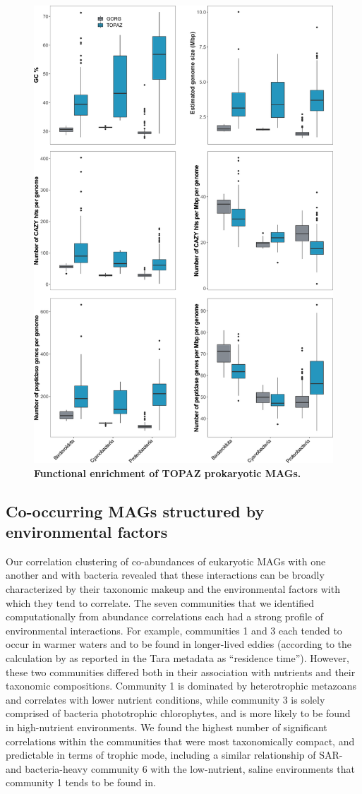 \documentclass[12pt]{article}
\numberwithin{equation}{section}
\begin{document}
\begin{figure}[h!]    
    \centering
    \includegraphics[width = 0.75\columnwidth]{figures/Figure2-TOPAZ_prok_features_vsGORG_mod.png}
    \caption{\textbf{Functional enrichment of TOPAZ prokaryotic MAGs.} }
    \label{fig:fig4-trophy}
\end{figure}

\subsection*{Co-occurring MAGs structured by environmental factors } %
Our correlation clustering of co-abundances of eukaryotic MAGs with one another and with bacteria revealed that these interactions can be broadly characterized by their taxonomic makeup and the environmental factors with which they tend to correlate. The seven communities that we identified computationally from abundance correlations each had a strong profile of environmental interactions. For example, communities 1 and 3 each tended to occur in warmer waters and to be found in longer-lived eddies (according to the calculation by \cite{d2010fluid} as reported in the Tara metadata \cite{taraoceansconsortium2014ross} as ``residence time''). However, these two communities differed both in their association with nutrients and their taxonomic compositions. Community 1 is dominated by heterotrophic metazoans and correlates with lower nutrient conditions, while community 3 is solely comprised of bacteria phototrophic chlorophytes, and is more likely to be found in high-nutrient environments. We found the highest number of significant correlations within the communities that were most taxonomically compact, and predictable in terms of trophic mode, including a similar relationship of SAR- and bacteria-heavy community 6 with the low-nutrient, saline environments that community 1 tends to be found in. 
\end{document}
